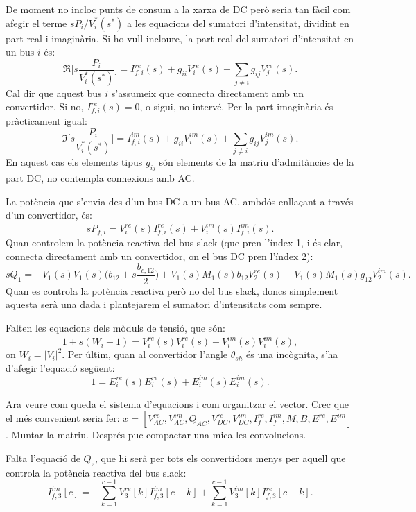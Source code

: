 \documentclass[11pt]{article}
\begin{document}
De moment no incloc punts de consum a la xarxa de DC però seria tan fàcil com afegir el terme $sP_i/V^*_i(s^*)$ a les equacions del sumatori d'intensitat, dividint en part real i imaginària. Si ho vull incloure, la part real del sumatori d'intensitat en un bus $i$ és:
\begin{equation}
    \Re\biggl[s\frac{P_i}{V^*_i(s^*)}\biggr] = I^{re}_{f,i}(s) + g_{ii}V^{re}_i(s) + \sum_{j\neq i}g_{ij}V^{re}_j(s).
\end{equation}
Cal dir que aquest bus $i$ s'assumeix que connecta directament amb un convertidor. Si no, $I^{re}_{f,i}(s)=0$, o sigui, no intervé. Per la part imaginària és pràcticament igual:
\begin{equation}
    \Im\biggl[s\frac{P_i}{V^*_i(s^*)}\biggr] = I^{im}_{f,i}(s) + g_{ii}V^{im}_i(s) + \sum_{j\neq i}g_{ij}V^{im}_j(s).
\end{equation}
En aquest cas els elements tipus $g_{ij}$ són elements de la matriu d'admitàncies de la part DC, no contempla connexions amb AC.

La potència que s'envia des d'un bus DC a un bus AC, ambdós enllaçant a través d'un convertidor, és:
\begin{equation}
    sP_{f,i} = V^{re}_i(s)I^{re}_{f,i}(s) + V^{im}_i(s)I^{im}_{f,i}(s).
\end{equation}
Quan controlem la potència reactiva del bus slack (que pren l'índex 1, i és clar, connecta directament amb un convertidor, on el bus DC pren l'índex 2):
\begin{equation}
    sQ_1 = -V_1(s)V_1(s)\biggl(b_{12} + s \frac{b_{c,12}}{2}\biggr) + V_1(s)M_1(s)b_{12}V^{re}_2(s) + V_1(s)M_1(s)g_{12}V^{im}_2(s).
\end{equation}
Quan es controla la potència reactiva però no del bus slack, doncs simplement aquesta serà una dada i plantejarem el sumatori d'intensitats com sempre. 

Falten les equacions dels mòduls de tensió, que són:
\begin{equation}
    1+s(W_i-1) = V^{re}_i(s)V^{re}_i(s) + V^{im}_i(s)V^{im}_i(s),
\end{equation}
on $W_i=|V_i|^2$. Per últim, quan al convertidor l'angle $\theta_{sh}$ és una incògnita, s'ha d'afegir l'equació següent:
\begin{equation}
    1 = E^{re}_i(s)E^{re}_i(s) + E^{im}_i(s)E^{im}_i(s).
\end{equation}

Ara veure com queda el sistema d'equacions i com organitzar el vector. Crec que el més convenient seria fer: $x=[V^{re}_{AC}, V^{im}_{AC}, Q_{AC}, V^{re}_{DC}, V^{im}_{DC}, I^{re}_f, I^{im}_f, M, B, E^{re}, E^{im}]$. Muntar la matriu. Després puc compactar una mica les convolucions.

Falta l'equació de $Q_z$, que hi serà per tots els convertidors menys per aquell que controla la potència reactiva del bus slack:
\begin{equation}
    I^{im}_{f,3}[c] = -\sum_{k=1}^{c-1}V^{re}_3[k]I^{im}_{f,3}[c-k] + \sum_{k=1}^{c-1}V^{im}_3[k]I^{re}_{f,3}[c-k].
\end{equation}
\end{document}
